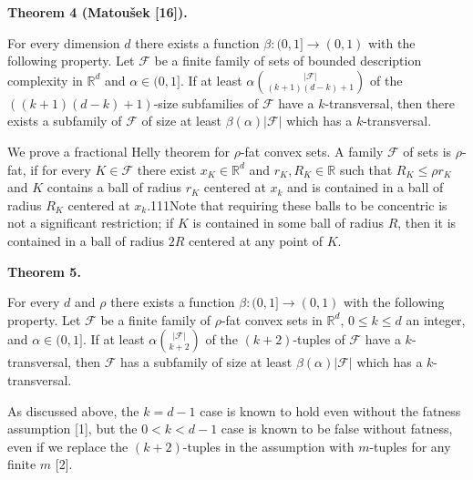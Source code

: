 \documentclass[10pt,a4paper]{amsart}
\begin{document}
\par
\par
\par\medskip\noindent\textbf{Theorem 4 (Matoušek [16]).}\par
For every dimension $d$ there exists a function $\beta\colon(0,1]\to(0,1)$ with the following property. Let $\mathcal{F}$ be a finite family of sets of bounded description complexity in $\mathbb{R}^{d}$ and $\alpha\in(0,1]$. If at least $\alpha\binom{|\mathcal{F}|}{(k+1)(d-k)+1}$ of the $((k+1)(d-k)+1)$-size subfamilies of $\mathcal{F}$ have a $k$-transversal, then there exists a subfamily of $\mathcal{F}$ of size at least $\beta(\alpha)|\mathcal{F}|$ which has a $k$-transversal.
\par
\par
\par
We prove a fractional Helly theorem for $\rho$-fat convex sets. A family $\mathcal{F}$ of sets is $\rho$-fat, if for every $K\in\mathcal{F}$ there exist $x_{K}\in\mathbb{R}^{d}$ and $r_{K},R_{K}\in\mathbb{R}$ such that $R_{K}\leq\rho r_{K}$ and $K$ contains a ball of radius $r_{K}$ centered at $x_{k}$ and is contained in a ball of radius $R_{K}$ centered at $x_{k}$.111Note that requiring these balls to be concentric is not a significant restriction; if $K$ is contained in some ball of radius $R$, then it is contained in a ball of radius $2R$ centered at any point of $K$.
\par
\par
\par\medskip\noindent\textbf{Theorem 5.}\par
For every $d$ and $\rho$ there exists a function $\beta\colon(0,1]\to(0,1)$ with the following property. Let $\mathcal{F}$ be a finite family of $\rho$-fat convex sets in $\mathbb{R}^{d}$, $0\leq k\leq d$ an integer, and $\alpha\in(0,1]$. If at least $\alpha\binom{|\mathcal{F}|}{k+2}$ of the $(k+2)$-tuples of $\mathcal{F}$ have a $k$-transversal, then $\mathcal{F}$ has a subfamily of size at least $\beta(\alpha)|\mathcal{F}|$ which has a $k$-transversal.
\par
\par
\par
As discussed above, the $k=d-1$ case is known to hold even without the fatness assumption [1], but the $0<k<d-1$ case is known to be false without fatness, even if we replace the $(k+2)$-tuples in the assumption with $m$-tuples for any finite $m$ [2].
\end{document}
